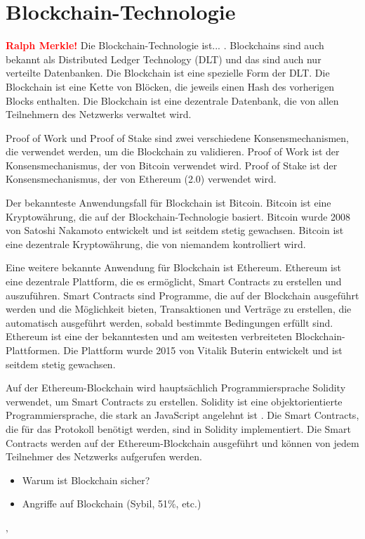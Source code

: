 \section{Blockchain-Technologie}
\textbf{\textcolor{red}{Ralph Merkle!}}
Die Blockchain-Technologie ist... . Blockchains sind auch bekannt als Distributed Ledger Technology (DLT) und das sind auch nur verteilte Datenbanken. Die Blockchain ist eine spezielle Form der DLT. Die Blockchain ist eine Kette von Blöcken, die jeweils einen Hash des vorherigen Blocks enthalten. Die Blockchain ist eine dezentrale Datenbank, die von allen Teilnehmern des Netzwerks verwaltet wird.

Proof of Work und Proof of Stake sind zwei verschiedene Konsensmechanismen, die verwendet werden, um die Blockchain zu validieren. Proof of Work ist der Konsensmechanismus, der von Bitcoin verwendet wird. Proof of Stake ist der Konsensmechanismus, der von Ethereum (2.0) verwendet wird.

Der bekannteste Anwendungsfall für Blockchain ist Bitcoin. Bitcoin ist eine Kryptowährung, die auf der Blockchain-Technologie basiert. Bitcoin wurde 2008 von Satoshi Nakamoto entwickelt und ist seitdem stetig gewachsen. Bitcoin ist eine dezentrale Kryptowährung, die von niemandem kontrolliert wird.

Eine weitere bekannte Anwendung für Blockchain ist Ethereum. Ethereum ist eine dezentrale Plattform, die es ermöglicht, Smart Contracts zu erstellen und auszuführen. Smart Contracts sind Programme, die auf der Blockchain ausgeführt werden und die Möglichkeit bieten, Transaktionen und Verträge zu erstellen, die automatisch ausgeführt werden, sobald bestimmte Bedingungen erfüllt sind. Ethereum ist eine der bekanntesten und am weitesten verbreiteten Blockchain-Plattformen. Die Plattform wurde 2015 von Vitalik Buterin entwickelt und ist seitdem stetig gewachsen.


Auf der Ethereum-Blockchain wird hauptsächlich Programmiersprache Solidity verwendet, um Smart Contracts zu erstellen. Solidity ist eine objektorientierte Programmiersprache, die stark an JavaScript angelehnt ist \parencite[S. 131]{Antonopoulos_MasteringEthereum}. Die Smart Contracts, die für das Protokoll benötigt werden, sind in Solidity implementiert. Die Smart Contracts werden auf der Ethereum-Blockchain ausgeführt und können von jedem Teilnehmer des Netzwerks aufgerufen werden.

\begin{itemize}
    \item Warum ist Blockchain sicher?
    \item Angriffe auf Blockchain (Sybil, 51\%, etc.)
\end{itemize}


‚